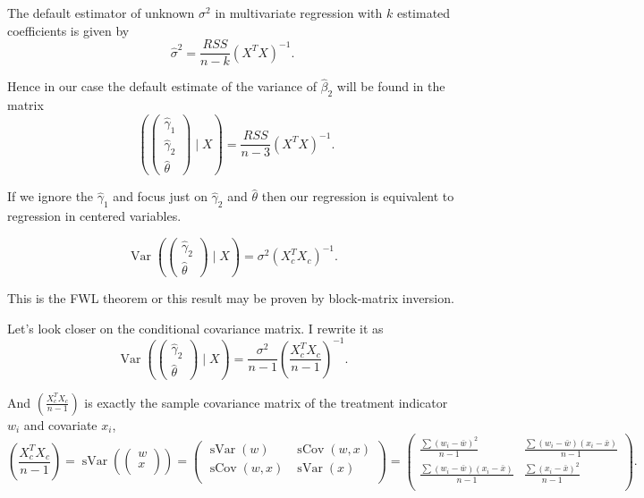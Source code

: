 \documentclass[10pt, a4paper]{article}
\DeclareMathOperator{\Var}{Var}
\DeclareMathOperator{\sVar}{sVar}
\DeclareMathOperator{\hVar}{\widehat{\Var}}
\DeclareMathOperator{\sCov}{sCov}
\begin{document}
The default estimator of unknown $\sigma^2$ in multivariate regression with $k$ 
estimated coefficients is given by 
\[
\hat\sigma^2 = \frac{RSS}{n - k} (X^TX)^{-1}.
\]

Hence in our case the default estimate of the variance of $\hat\beta_2$ will be found 
in the matrix
\[
        \hVar\left( 
        \begin{pmatrix}    
            \hat \gamma_1 \\
            \hat \gamma_2 \\
            \hat \theta
        \end{pmatrix}
        \mid X \right) = \frac{RSS}{n - 3} (X^TX)^{-1}.
\]



If we ignore the $\hat\gamma_1$ and focus just on $\hat\gamma_2$ and $\hat\theta$ then 
our regression is equivalent to regression in centered variables.

\[
\Var\left( 
    \begin{pmatrix}    
        \hat \gamma_2 \\
        \hat \theta
    \end{pmatrix}
    \mid X \right) = \sigma^2 (X_c^TX_c)^{-1}.
\]

This is the FWL theorem or this result may be proven by block-matrix inversion. 


Let's look closer on the conditional covariance matrix.
I rewrite it as 
\[
    \Var\left( 
        \begin{pmatrix}    
            \hat \gamma_2 \\
            \hat \theta
        \end{pmatrix}
        \mid X \right) = \frac{\sigma^2}{n-1} \left(\frac{X_c^TX_c}{n-1}\right)^{-1}.        
\]

And $\left(\frac{X_c^TX_c}{n-1}\right)$ is exactly the sample covariance matrix of the treatment 
indicator $w_i$ and covariate $x_i$, 
\[
    \left(\frac{X_c^TX_c}{n-1}\right) = \sVar\left(
        \begin{pmatrix}    
            w \\
            x \\
        \end{pmatrix}
    \right) =  
    \begin{pmatrix}    
        \sVar(w) & \sCov(w, x) \\
        \sCov(w, x) & \sVar(x) \\
    \end{pmatrix}
    =
    \begin{pmatrix}    
        \frac{\sum (w_i - \bar w)^2}{n-1} & \frac{\sum (w_i - \bar w)(x_i - \bar x)}{n-1} \\
        \frac{\sum (w_i - \bar w)(x_i - \bar x)}{n-1} & \frac{\sum (x_i - \bar x)^2}{n-1} \\
    \end{pmatrix}.    
\]
\end{document}
